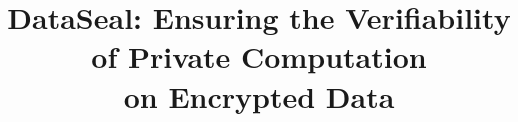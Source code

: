 \documentclass[conference,compsoc]{IEEEtran}
\begin{document}
%
\title{DataSeal: Ensuring the Verifiability of Private Computation \\ on Encrypted Data}






% 
\end{document}
